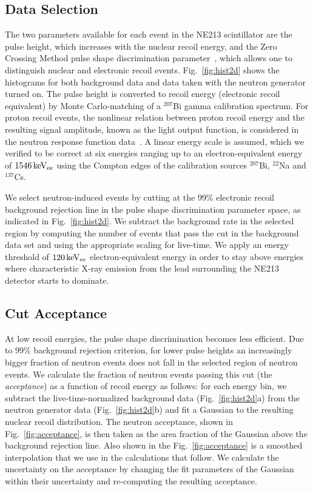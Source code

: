 \subsection{Data Selection}\label{sec:ng_data_selection}

The two parameters available for each event in the NE213 scintillator are the pulse height, which increases with the nuclear recoil energy, and the Zero Crossing Method pulse shape discrimination parameter~\cite{Alexander:1961}, which allows one to distinguish nuclear and electronic recoil events. Fig.~\ref{fig:hist2d} shows the histograms for both background data and data taken with the neutron generator turned on. The pulse height is converted to recoil energy (electronic recoil equivalent) by Monte Carlo-matching of a $^{207}$Bi gamma calibration spectrum. For proton recoil events, the nonlinear relation between proton recoil energy and the resulting signal amplitude, known as the light output function, is considered in the neutron response function data~\cite{Novotny:1997}.
A linear energy scale is assumed, which we verified to be correct at six energies ranging up to an electron-equivalent energy of $1546\,\mathrm{keV_{ee}}$ using the Compton edges of the calibration sources $^{207}$Bi, $^{22}$Na and $^{137}$Cs.

We select neutron-induced events by cutting at the $99\%$ electronic recoil background rejection line in the pulse shape discrimination parameter space, as indicated in Fig.~\ref{fig:hist2d}. We subtract the background rate in the selected region by computing the number of events that pass the cut in the background data set and using the appropriate scaling for live-time.
We apply an energy threshold of $120\,\mathrm{keV_{ee}}$ electron-equivalent energy in order to stay above energies where characteristic X-ray emission from the lead surrounding the NE213 detector starts to dominate.

\subsection{Cut Acceptance}

At low recoil energies, the pulse shape discrimination becomes less efficient. Due to $99\%$ background rejection criterion, for lower pulse heights an increasingly bigger fraction of neutron events does not fall in the selected region of neutron events. We calculate the fraction of neutron events passing this cut (the \emph{acceptance}) as a function of recoil energy as follows: for each energy bin, we subtract the live-time-normalized background data (Fig.~\ref{fig:hist2d}a) from the neutron generator data (Fig.~\ref{fig:hist2d}b) and fit a Gaussian to the resulting nuclear recoil distribution. The neutron acceptance, shown in Fig.~\ref{fig:acceptance}, is then taken as the area fraction of the Gaussian above the background rejection line. Also shown in the Fig.~\ref{fig:acceptance} is a smoothed interpolation that we use in the calculations that follow. We calculate the uncertainty on the acceptance by changing the fit parameters of the Gaussian within their uncertainty and re-computing the resulting acceptance.

